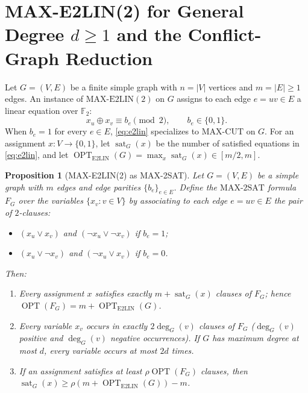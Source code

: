 \documentclass[pdflatex,sn-mathphys-num]{sn-jnl}%
\theoremstyle{thmstyleone}%
\newtheorem{Proposition}[Theorem]{Proposition}
\theoremstyle{thmstyletwo}%
\theoremstyle{thmstylethree}%
\begin{document}


\maketitle

\section{MAX-E2LIN(2) for General Degree $d \ge 1$ and the Conflict-Graph Reduction}

Let $G=(V,E)$ be a finite simple graph with $n=|V|$ vertices and $m=|E| \ge 1$ edges. An instance of $\mathrm{MAX\text{-}E2LIN}(2)$ on $G$ assigns to each edge $e=uv\in E$ a linear equation over $\mathbb{F}_2$:
\begin{equation}\label{eq:e2lin}
x_u \oplus x_v \equiv b_e \pmod{2}, \qquad b_e \in \{0,1\}.
\end{equation}
When $b_e = 1$ for every $e \in E$, \eqref{eq:e2lin} specializes to $\mathrm{MAX\text{-}CUT}$ on $G$. For an assignment $x : V \to \{0,1\}$, let $\operatorname{sat}_G(x)$ be the number of satisfied equations in \eqref{eq:e2lin}, and let $\operatorname{OPT}_{\mathrm{E2LIN}}(G) = \max_x \operatorname{sat}_G(x) \in [m/2, m]$.

\begin{Proposition}[MAX-E2LIN(2) as MAX-2SAT]\label{prop:e2lin2sat}
Let $G=(V,E)$ be a simple graph with $m$ edges and edge parities $\{b_e\}_{e\in E}$. Define the $\mathrm{MAX\text{-}2SAT}$ formula $F_G$ over the variables $\{x_v : v\in V\}$ by associating to each edge $e=uv\in E$ the pair of $2$-clauses:
\begin{itemize}
\item $(x_u \lor x_v)$ and $(\lnot x_u \lor \lnot x_v)$ if $b_e = 1$;
\item $(x_u \lor \lnot x_v)$ and $(\lnot x_u \lor x_v)$ if $b_e = 0$.
\end{itemize}
Then:
\begin{enumerate}
\item Every assignment $x$ satisfies exactly $m + \operatorname{sat}_G(x)$ clauses of $F_G$; hence $\operatorname{OPT}(F_G) = m + \operatorname{OPT}_{\mathrm{E2LIN}}(G)$.
\item Every variable $x_v$ occurs in exactly $2\deg_G(v)$ clauses of $F_G$ ($\deg_G(v)$ positive and $\deg_G(v)$ negative occurrences). If $G$ has maximum degree at most $d$, every variable occurs at most $2d$ times.
\item If an assignment satisfies at least $\rho \operatorname{OPT}(F_G)$ clauses, then $\operatorname{sat}_G(x) \ge \rho(m + \operatorname{OPT}_{\mathrm{E2LIN}}(G)) - m$.
\end{enumerate}
\end{Proposition}
\end{document}
